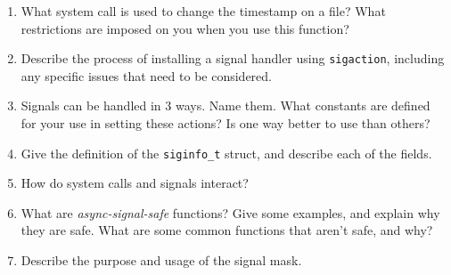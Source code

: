 \documentclass[letterpaper,10pt,onecolumn,titlepage]{article}
\begin{document}
\begin{enumerate}
\begin{quote}

\end{quote}

\item What system call is used to change the timestamp on a file? What restrictions are
  imposed on you when you use this function?

\begin{quote}

\end{quote}

\item Describe the process of installing a signal handler using \texttt{sigaction},
  including any specific issues that need to be considered.

\begin{quote}

\end{quote}

\item Signals can be handled in 3 ways. Name them. What constants are defined for your
  use in setting these actions? Is one way better to use than others?

\begin{quote}

\end{quote}

\item Give the definition of the \texttt{siginfo\_t} struct, and describe each of the
  fields.

\begin{quote}

\end{quote}

\item How do system calls and signals interact?

\begin{quote}

\end{quote}

\item What are \emph{async-signal-safe} functions? Give some examples, and explain why
  they are safe. What are some common functions that aren't safe, and why?

\begin{quote}

\end{quote}

\item Describe the purpose and usage of the signal mask.


\end{enumerate}
\end{document}
